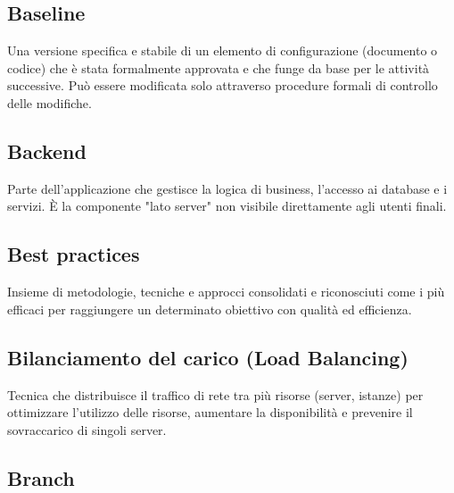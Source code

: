 \documentclass[a4paper, 11pt, oneside]{scrartcl} %
\begin{document}
\subsection*{Baseline}
Una versione specifica e stabile di un elemento di configurazione (documento o codice) che è stata formalmente approvata e che funge da base per le attività successive. Può essere modificata solo attraverso procedure formali di controllo delle modifiche.
\vspace{0.5cm}

\subsection*{Backend}


Parte dell'applicazione che gestisce la logica di business, l'accesso ai database e i servizi. È la componente "lato server" non visibile direttamente agli utenti finali.

\vspace{0.5cm}

\subsection*{Best practices}


Insieme di metodologie, tecniche e approcci consolidati e riconosciuti come i più efficaci per raggiungere un determinato obiettivo con qualità ed efficienza.

\vspace{0.5cm}

\subsection*{Bilanciamento del carico (Load Balancing)}


Tecnica che distribuisce il traffico di rete tra più risorse (server, istanze) per ottimizzare l'utilizzo delle risorse, aumentare la disponibilità e prevenire il sovraccarico di singoli server.

\vspace{0.5cm}

\subsection*{Branch}
\end{document}
